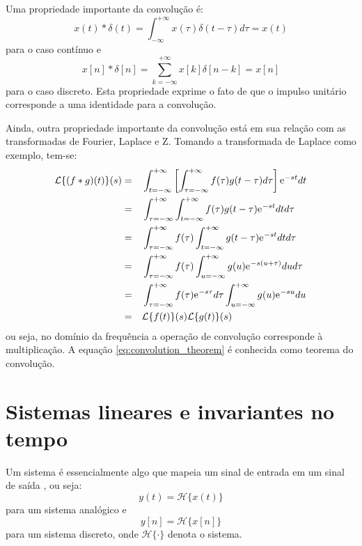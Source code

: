 \documentclass[12pt,a4paper]{report}
\newcommand{\euler}{{\mathrm{e}\mkern1mu}}
\begin{document}
  Uma propriedade importante da convolução é:
  \begin{equation}
    \label{eq:continuous_convolution_identity}
    x(t) \ast \delta(t) = \int_{-\infty}^{+\infty} x(\tau) \delta(t - \tau) d\tau = x(t)
  \end{equation}
  para o caso contínuo e
  \begin{equation}
    \label{eq:discrete_convolution_identity}
    x[n] \ast \delta[n] = \sum_{k = -\infty}^{+\infty} x[k] \delta[n - k] = x[n]
  \end{equation}
  para o caso discreto. Esta propriedade exprime o fato de que o impulso unitário corresponde a uma identidade
  para a convolução.

  Ainda, outra propriedade importante da convolução está em sua relação com as transformadas de Fourier, Laplace
  e Z. Tomando a transformada de Laplace como exemplo, tem-se:
  \begin{equation}
    \label{eq:convolution_theorem}
    \begin{split}
      \mathcal{L}\{(f \ast g)(t)\}(s) = &\quad \int_{t = -\infty}^{+\infty} \left[\int_{\tau = -\infty}^{+\infty}
      f(\tau) g(t - \tau) d\tau\right] \euler^{-s t} dt
      \\ = &\quad \int_{\tau = -\infty}^{+\infty} \int_{t = -\infty}^{+\infty}
      f(\tau) g(t - \tau) \euler^{-s t} dt d\tau
      \\ = &\quad \int_{\tau = -\infty}^{+\infty} f(\tau) \int_{t = -\infty}^{+\infty}
      g(t - \tau) \euler^{-s t} dt d\tau
      \\ = &\quad \int_{\tau = -\infty}^{+\infty} f(\tau) \int_{u = -\infty}^{+\infty}
      g(u) \euler^{-s(u+\tau)} du d\tau
      \\ = &\quad \int_{\tau = -\infty}^{+\infty} f(\tau) \euler^{-s \tau} d\tau
      \int_{u = -\infty}^{+\infty} g(u) \euler^{-s u} du
      \\ = &\quad \mathcal{L}\{f(t)\}(s) \mathcal{L}\{g(t)\}(s)
    \end{split}
  \end{equation}
  ou seja, no domínio da frequência a operação de convolução corresponde à multiplicação. A equação
  \ref{eq:convolution_theorem} é conhecida como teorema do convolução.

\section{Sistemas lineares e invariantes no tempo}
  Um sistema é essencialmente algo que mapeia um sinal de entrada em um sinal de saída \cite{diniz}, ou seja:
  \begin{equation}
    y(t) = \mathcal{H}\{x(t)\}
  \end{equation}
  para um sistema analógico e
  \begin{equation}
    y[n] = \mathcal{H}\{x[n]\}
  \end{equation}
  para um sistema discreto, onde $\mathcal{H}\{\cdot\}$ denota o sistema.
\end{document}

